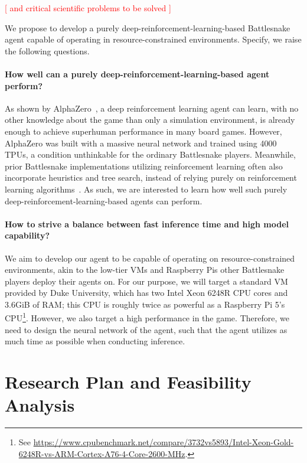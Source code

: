 \documentclass[a4paper]{article}
\newcommand{\todo}[1]{\textcolor{red}{[ #1 ]}}
\begin{document}
\todo{and critical scientific problems to be solved}

We propose to develop a purely deep-reinforcement-learning-based Battlesnake
agent capable of operating in resource-constrained environments. Specify,
we raise the following questions.

\paragraph{How well can a purely deep-reinforcement-learning-based agent
    perform?
} As shown by AlphaZero~\cite{silver2017mastering},
a deep reinforcement learning agent can learn,
with no other knowledge about the game than only a simulation environment,
is already enough to achieve superhuman performance in many board games.
However,
AlphaZero was built with a massive neural network and trained using 4000 TPUs,
a condition unthinkable for the ordinary Battlesnake players. Meanwhile,
prior Battlesnake implementations utilizing reinforcement learning often also
incorporate heuristics and tree search,
instead of relying purely on reinforcement learning
algorithms~\cite{chung2020battlesnake,binnersley2020battlesnake}. As such,
we are interested to learn how well such purely
deep-reinforcement-learning-based agents can perform.

\paragraph{How to strive a balance between fast inference time and high model
    capability?
}
We aim to develop our agent to be capable of operating on resource-constrained
environments,
akin to the low-tier VMs and Raspberry Pis other Battlesnake players deploy
their agents on. For our purpose,
we will target a standard VM provided by Duke University,
which has two Intel Xeon 6248R CPU cores and 3.6GiB of RAM;
this CPU is roughly twice as powerful as a Raspberry Pi 5's CPU\footnote{See
    \url{https://www.cpubenchmark.net/compare/3732vs5893/Intel-Xeon-Gold-6248R-vs-ARM-Cortex-A76-4-Core-2600-MHz}.
}. However, we also target a high performance in the game. Therefore,
we need to design the neural network of the agent,
such that the agent utilizes as much time as possible when conducting inference.

\section{Research Plan and Feasibility Analysis}
\end{document}
